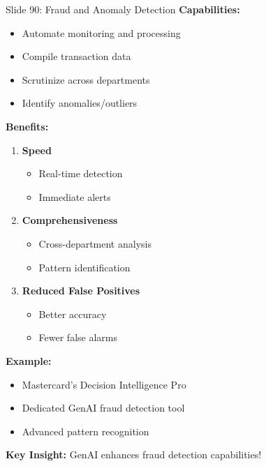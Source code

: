 \documentclass[8pt]{beamer}
\begin{document}
	\begin{frame}{Slide 90: Fraud and Anomaly Detection}
		\fontsize{6.5}{7.5}\selectfont
		\textbf{Capabilities:}
		\begin{itemize}
			\item Automate monitoring and processing
			\item Compile transaction data
			\item Scrutinize across departments
			\item Identify anomalies/outliers
		\end{itemize}
		
		\vspace{0.1cm}
		\textbf{Benefits:}
		\begin{enumerate}
			\item \textbf{Speed}
			\begin{itemize}
				\item Real-time detection
				\item Immediate alerts
			\end{itemize}
			\item \textbf{Comprehensiveness}
			\begin{itemize}
				\item Cross-department analysis
				\item Pattern identification
			\end{itemize}
			\item \textbf{Reduced False Positives}
			\begin{itemize}
				\item Better accuracy
				\item Fewer false alarms
			\end{itemize}
		\end{enumerate}
		
		\vspace{0.1cm}
		\textbf{Example:}
		\begin{itemize}
			\item Mastercard's Decision Intelligence Pro
			\item Dedicated GenAI fraud detection tool
			\item Advanced pattern recognition
		\end{itemize}
		
		\textcolor{myblue}{\textbf{Key Insight:}} GenAI enhances fraud detection capabilities!
	\end{frame}
	
\end{document}
